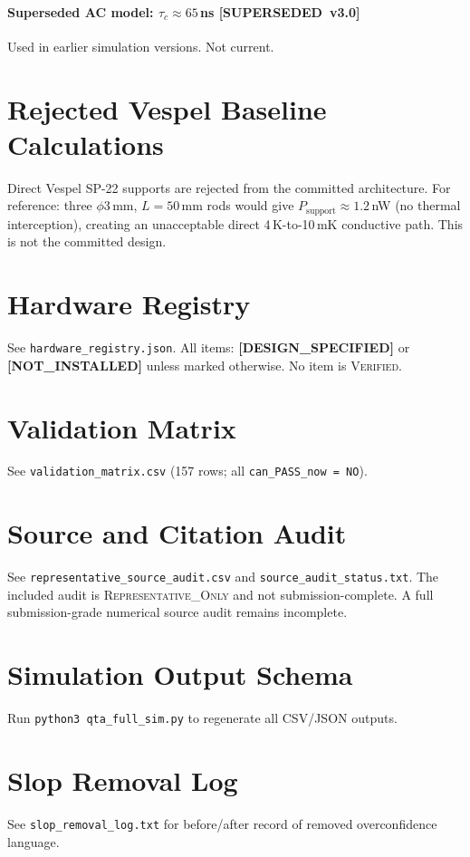 \documentclass[12pt,a4paper]{article}
\newcommand{\designspec}{\textbf{[DESIGN\_SPECIFIED]}}
\newcommand{\notinstalled}{\textbf{[NOT\_INSTALLED]}}
\newcommand{\superseded}{\textbf{[SUPERSEDED~v3.0]}}
\begin{document}
\paragraph{Superseded AC model: $\tau_c \approx 65$\,ns \superseded{}}
Used in earlier simulation versions.
Not current.

\section{Rejected Vespel Baseline Calculations}
\label{app:vespel_rejected}

Direct Vespel SP-22 supports are rejected from the committed architecture.
For reference: three $\phi3$\,mm, $L=50$\,mm rods would give
$P_\mathrm{support} \approx 1.2$\,nW (no thermal interception),
creating an unacceptable direct 4\,K-to-10\,mK conductive path.
This is not the committed design.

\section{Hardware Registry}
\label{app:hardware}
See \texttt{hardware\_registry.json}.
All items: \designspec{} or \notinstalled{} unless marked otherwise.
No item is \textsc{Verified}.

\section{Validation Matrix}
\label{app:valmat}
See \texttt{validation\_matrix.csv} (157 rows; all \texttt{can\_PASS\_now = NO}).

\section{Source and Citation Audit}
\label{app:sources}
See \texttt{representative\_source\_audit.csv} and \texttt{source\_audit\_status.txt}. The included audit is \textsc{Representative\_Only} and not submission-complete. A full submission-grade numerical source audit remains incomplete.

\section{Simulation Output Schema}
\label{app:sim}
Run \verb|python3 qta_full_sim.py| to regenerate all CSV/JSON outputs.

\section{Slop Removal Log}
\label{app:slop}
See \texttt{slop\_removal\_log.txt} for before/after record of removed
overconfidence language.
\end{document}
